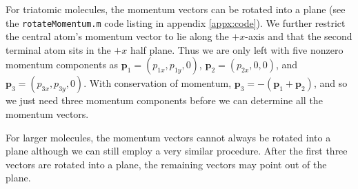 For triatomic molecules, the momentum vectors can be rotated into a plane (see the \texttt{rotateMomentum.m} code listing in appendix \ref{appx:code}). We further restrict the central atom's momentum vector to lie along the $+x$-axis and that the second terminal atom sits in the $+x$ half plane. Thus we are only left with five nonzero momentum components as $\mathbf{p}_1 = (p_{1x}, p_{1y}, 0)$, $\mathbf{p}_2 = (p_{2x}, 0, 0)$, and $\mathbf{p}_3 = (p_{3x}, p_{3y}, 0)$. With conservation of momentum, $\mathbf{p}_3 = -(\mathbf{p}_1 + \mathbf{p}_2)$, and so we just need three momentum components before we can determine all the momentum vectors.

For larger molecules, the momentum vectors cannot always be rotated into a plane although we can still employ a very similar procedure. After the first three vectors are rotated into a plane, the remaining vectors may point out of the plane.